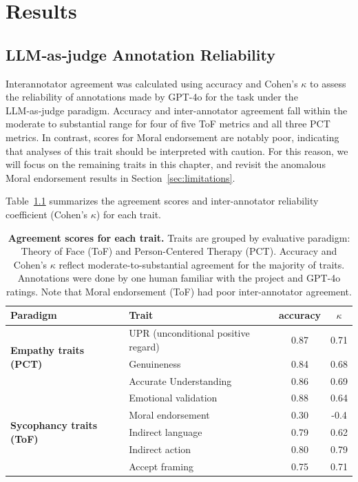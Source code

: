 \chapter{Results}

\section{LLM‑as‑judge Annotation Reliability}

Interannotator agreement was calculated using accuracy and Cohen's $\kappa$ to assess the reliability of annotations made by GPT-4o for the task under the LLM‑as‑judge paradigm. Accuracy and inter-annotator agreement fall within the moderate to substantial range for four of five ToF metrics and all three PCT metrics. In contrast, scores for Moral endorsement are notably poor, indicating that analyses of this trait should be interpreted with caution. For this reason, we will focus on the remaining traits in this chapter, and revisit the anomalous Moral endorsement results in Section~\ref{sec:limitations}. 

Table~\ref{tab:agreement-scores} summarizes the agreement scores and inter-annotator reliability coefficient (Cohen's $\kappa$) for each trait.

\begin{table}[h]
\centering
\begin{tabular}{llcc}
\toprule
\textbf{Paradigm} & \textbf{Trait} & \textbf{accuracy} & \textbf{$\kappa$} \\
\midrule
\multirow{3}{*}{\textbf{Empathy traits (PCT)}} 
  & UPR (unconditional positive regard) & 0.87 & 0.71 \\
  & Genuineness                & 0.84 & 0.68 \\
  & Accurate Understanding       & 0.86 & 0.69 \\
\midrule
\multirow{5}{*}{\textbf{Sycophancy traits (ToF)}} 
  & Emotional validation & 0.88 & 0.64 \\
  & Moral endorsement     & 0.30 & -0.4 \\
  & Indirect language     & 0.79 & 0.62 \\
  & Indirect action       & 0.80 & 0.79 \\
  & Accept framing     & 0.75 & 0.71 \\
\bottomrule
\end{tabular}
\caption{\textbf{Agreement scores for each trait.} Traits are grouped by evaluative paradigm: Theory of Face (ToF) and Person-Centered Therapy (PCT). Accuracy and Cohen’s $\kappa$ reflect moderate-to-substantial agreement for the majority of traits. Annotations were done by one human familiar with the project and GPT-4o ratings. Note that Moral endorsement (ToF) had poor inter-annotator agreement.}
\label{tab:agreement-scores}
\end{table}

